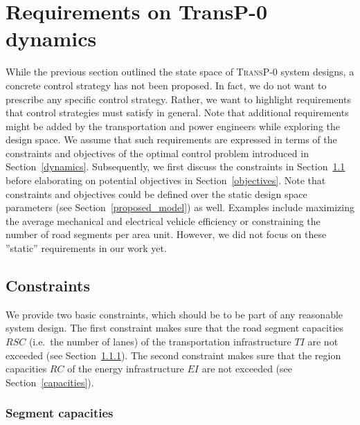\section{Requirements on \textbf{TransP-0} dynamics}
\label{requirements}

While the previous section outlined the state space of \textsc{TransP-0} system designs, a concrete control strategy has not been proposed. In fact, we do not want to prescribe any specific control strategy. Rather, we want to highlight requirements that control strategies must satisfy in general. Note that additional requirements might be added by the transportation and power engineers while exploring the design space. We assume that such requirements are expressed in terms of the constraints and objectives of the optimal control problem introduced in Section~\ref{dynamics}. Subsequently, we first discuss the constraints in Section~\ref{constraints} before elaborating on potential objectives in Section~\ref{objectives}. Note that constraints and objectives could be defined over the static design space parameters (see Section~\ref{proposed_model}) as well. Examples include maximizing the average mechanical and electrical vehicle efficiency or constraining the number of road segments per area unit. However, we did not focus on these ''static'' requirements in our work yet.

\subsection{Constraints}
\label{constraints}

We provide two basic constraints, which should be to be part of any reasonable system design. The first constraint makes sure that the road segment capacities $RSC$ (i.e.\ the number of lanes) of the transportation infrastructure $TI$ are not exceeded (see Section~\ref{collisions}). The second constraint makes sure that the region capacities $RC$ of the energy infrastructure $EI$ are not exceeded (see Section~\ref{capacities}).

\subsubsection{Segment capacities}
\label{collisions}

